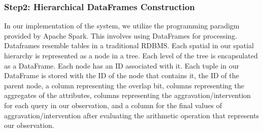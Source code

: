 


\subsubsection{Step2: Hierarchical DataFrames Construction}
In our implementation of the system, we utilize the programming paradigm provided by Apache Spark. This involves using DataFrames for processing. Dataframes resemble tables in a traditional RDBMS. Each spatial {\explanation}in our spatial hierarchy is represented as a node in a tree. Each level of the tree is encapsulated as a DataFrame. Each node has an ID associated with it. Each tuple in our DataFrame is stored with the ID of the node that contains it, the ID of the parent node, a column representing the overlap bit, columns representing the aggregates of the attributes, columns representing the aggravation/intervention for each query in our observation, and a column for the final values of aggravation/intervention after evaluating the arithmetic operation that represents our observation. 


